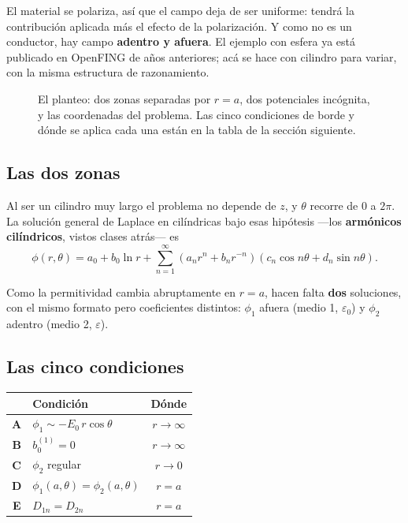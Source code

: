 \documentclass[12pt,a4paper]{article}
\begin{document}
\begin{notebox}
El material se polariza, así que el campo deja de ser uniforme: tendrá la
contribución aplicada más el efecto de la polarización. Y como no es un
conductor, hay campo \textbf{adentro y afuera}. El ejemplo con esfera ya está
publicado en OpenFING de años anteriores; acá se hace con cilindro para variar,
con la misma estructura de razonamiento.
\end{notebox}

\begin{figure}[H]
  \centering
  
  \caption{El planteo: dos zonas separadas por $r=a$, dos potenciales incógnita,
  y las coordenadas del problema. Las cinco condiciones de borde y dónde se
  aplica cada una están en la tabla de la sección siguiente.}
\end{figure}

\subsection{Las dos zonas}

Al ser un cilindro muy largo el problema no depende de $z$, y $\theta$ recorre de
$0$ a $2\pi$. La solución general de Laplace en cilíndricas bajo esas hipótesis
---los \textbf{armónicos cilíndricos}, vistos clases atrás--- es
\[
\phi(r,\theta) = a_0 + b_0 \ln r
+ \sum_{n=1}^{\infty} \left(a_n r^n + b_n r^{-n}\right)
\left(c_n \cos n\theta + d_n \sin n\theta\right).
\]

Como la permitividad cambia abruptamente en $r=a$, hacen falta \textbf{dos}
soluciones, con el mismo formato pero coeficientes distintos: $\phi_1$ afuera
(medio 1, $\varepsilon_0$) y $\phi_2$ adentro (medio 2, $\varepsilon$).

\subsection{Las cinco condiciones}

\begin{table}[H]
  \centering
  \begin{tabular}{clc}
    \toprule
     & Condición & Dónde \\
    \midrule
    \textbf{A} & $\phi_1 \sim -E_0\, r\cos\theta$      & $r \to \infty$ \\
    \textbf{B} & $b_0^{(1)} = 0$                       & $r \to \infty$ \\
    \textbf{C} & $\phi_2$ regular                      & $r \to 0$ \\
    \textbf{D} & $\phi_1(a,\theta) = \phi_2(a,\theta)$ & $r = a$ \\
    \textbf{E} & $D_{1n} = D_{2n}$                     & $r = a$ \\
    \bottomrule
  \end{tabular}
\end{table}
\end{document}
